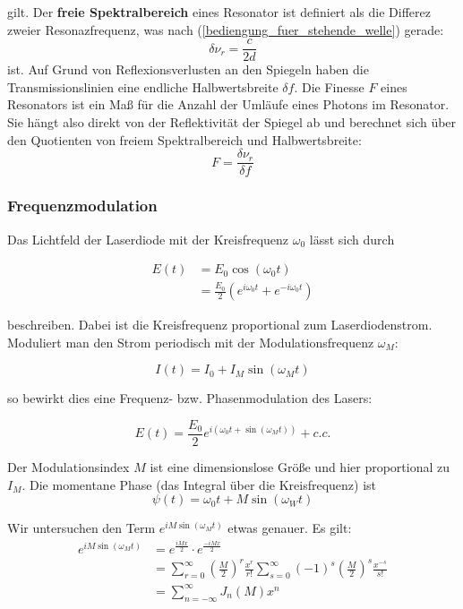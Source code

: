 \documentclass[a4paper,oneside]{article}
\begin{document}
gilt. Der \textbf{freie Spektralbereich} eines Resonator ist definiert als die Differez zweier Resonazfrequenz, was nach (\ref{bediengung_fuer_stehende_welle}) gerade:
\begin{equation}
 \delta \nu_r=\frac{c}{2d}
\end{equation}
ist. Auf Grund von Reflexionsverlusten an den Spiegeln haben die Transmissionslinien eine endliche Halbwertsbreite $\delta f$. Die Finesse $F$ eines Resonators ist ein Maß für die Anzahl der Umläufe eines Photons im Resonator. Sie hängt also direkt von der Reflektivität der Spiegel ab und berechnet sich über den Quotienten von freiem Spektralbereich und Halbwertsbreite:
\begin{equation}
 F=\frac{\delta \nu_r}{\delta f}
\end{equation}

\subsubsection{Frequenzmodulation}
\label{theorie_fm}
Das Lichtfeld der Laserdiode mit der Kreisfrequenz $\omega_0$ lässt sich durch


\begin{align}
E(t)  &=E_0\cos(\omega_0t)\\ 
  &=\frac{E_0}{2}(e^{i\omega_0t}+e^{-i\omega_0t})
\end{align}

beschreiben. Dabei ist die Kreisfrequenz proportional zum Laserdiodenstrom. Moduliert man den Strom periodisch mit der Modulationsfrequenz $\omega_M$:

\begin{equation}
 I(t)=I_0+I_M\sin(\omega_Mt)
\end{equation}

so bewirkt dies eine Frequenz- bzw. Phasenmodulation des Lasers:

\begin{equation}
 E(t)=\frac{E_0}{2}e^{i(\omega_0t+\sin(\omega_Mt))}+c.c.
\end{equation}

Der Modulationsindex $M$ ist eine dimensionslose Größe und hier proportional zu $I_M$. Die momentane Phase (das Integral über die Kreisfrequenz) ist
\begin{equation*}
 \psi(t)=\omega_0t+M\sin(\omega_Wt)
\end{equation*}

Wir untersuchen den Term $e^{iM\sin(\omega_Mt)}$ etwas genauer. Es gilt:
\begin{align}
 e^{iM\sin(\omega_Mt)}&=e^{\frac{iMx}{2}}\cdot e^{\frac{-iMx}{2}}\\
&=\sum_{r=0}^{\infty} \left(\frac{M}{2}\right)^r\frac{x^r}{r!}\sum_{s=0}^{\infty} (-1)^s\left(\frac{M}{2}\right)^s\frac{x^{-s}}{s!}\\
&=\sum_{n=-\infty}^{\infty}J_n(M)x^n
\end{align}
\end{document}

